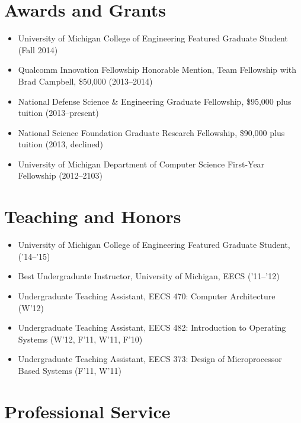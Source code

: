 \documentclass{article}
\begin{document}
\section*{Awards and Grants}

\begin{itemize}

  \item[] University of Michigan College of Engineering Featured Graduate Student (Fall 2014)
  \item[] Qualcomm Innovation Fellowship Honorable Mention, Team Fellowship with Brad Campbell, \$50,000 (2013--2014)
  \item[] National Defense Science \& Engineering Graduate Fellowship, \$95,000 plus tuition (2013--present)
  \item[] National Science Foundation Graduate Research Fellowship, \$90,000 plus tuition (2013, declined)
  \item[] University of Michigan Department of Computer Science First-Year Fellowship (2012--2103)

\end{itemize}

\section*{Teaching and Honors}

\begin{itemize}

  \item[] University of Michigan College of Engineering Featured Graduate Student, ('14--'15)
  \item[] Best Undergraduate Instructor, University of Michigan, EECS ('11--'12)
  \item[] Undergraduate Teaching Assistant, EECS 470: Computer Architecture (W'12)
  \item[] Undergraduate Teaching Assistant, EECS 482: Introduction to Operating Systems (W'12, F'11, W'11, F'10)
  \item[] Undergraduate Teaching Assistant, EECS 373: Design of Microprocessor Based Systems (F'11, W'11)

\end{itemize}

\section*{Professional Service}
\end{document}
